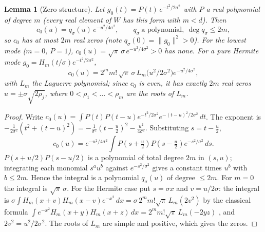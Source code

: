 \documentclass[11pt]{amsart}
\newtheorem{lemma}[theorem]{Lemma}
\theoremstyle{definition}
\theoremstyle{remark}
\begin{document}
\begin{lemma}[Zero structure]\label{lem:auto}
Let $g_0(t)=P(t)\,e^{-t^2/2\sigma^2}$ with $P$ a real polynomial of degree $m$
(every real element of $W$ has this form with $m<d$). Then
\[
c_0(u)=q_\sigma(u)\,e^{-u^2/4\sigma^2},\qquad q_\sigma\ \text{a polynomial},\
\deg q_\sigma\le 2m,
\]
so $c_0$ has at most $2m$ real zeros (note $q_\sigma(0)=\|g_0\|^2>0$). For the lowest
mode ($m=0$, $P=1$), $c_0(u)=\sqrt{\pi}\,\sigma\,e^{-u^2/4\sigma^2}>0$ has none.
For a pure Hermite mode $g_0=H_m(t/\sigma)e^{-t^2/2\sigma^2}$,
\[
c_0(u)=2^m m!\,\sqrt{\pi}\,\sigma\,L_m\!\bigl(u^2/2\sigma^2\bigr)e^{-u^2/4\sigma^2},
\]
with $L_m$ the Laguerre polynomial; since $c_0$ is even, it has exactly $2m$
real zeros $u=\pm\sigma\sqrt{2\rho_j}$, where $0<\rho_1<\dots<\rho_m$ are the
roots of $L_m$.
\end{lemma}
\begin{proof}
Write $c_0(u)=\int P(t)P(t-u)e^{-t^2/2\sigma^2}e^{-(t-u)^2/2\sigma^2}\,dt$. The
exponent is $-\frac1{2\sigma^2}(t^2+(t-u)^2)=-\frac1{\sigma^2}(t-\tfrac u2)^2
-\frac{u^2}{4\sigma^2}$. Substituting $s=t-\tfrac u2$,
\[
c_0(u)=e^{-u^2/4\sigma^2}\int P(s+\tfrac u2)P(s-\tfrac u2)e^{-s^2/\sigma^2}\,ds .
\]
$P(s+u/2)P(s-u/2)$ is a polynomial of total degree $2m$ in $(s,u)$; integrating
each monomial $s^au^b$ against $e^{-s^2/\sigma^2}$ gives a constant times $u^b$
with $b\le2m$. Hence the integral is a polynomial $q_\sigma(u)$ of degree
$\le2m$. For $m=0$ the integral is $\sqrt\pi\,\sigma$. For the Hermite case put
$s=\sigma x$ and $v=u/2\sigma$: the integral is
$\sigma\int H_m(x+v)H_m(x-v)e^{-x^2}\,dx=\sigma\,2^mm!\sqrt\pi\,L_m(2v^2)$ by the
classical formula $\int e^{-x^2}H_m(x+y)H_m(x+z)\,dx=2^mm!\sqrt\pi\,L_m(-2yz)$
\cite[7.377]{GR}, and $2v^2=u^2/2\sigma^2$. The roots of $L_m$ are simple and
positive, which gives the zeros.
\end{proof}
\end{document}
